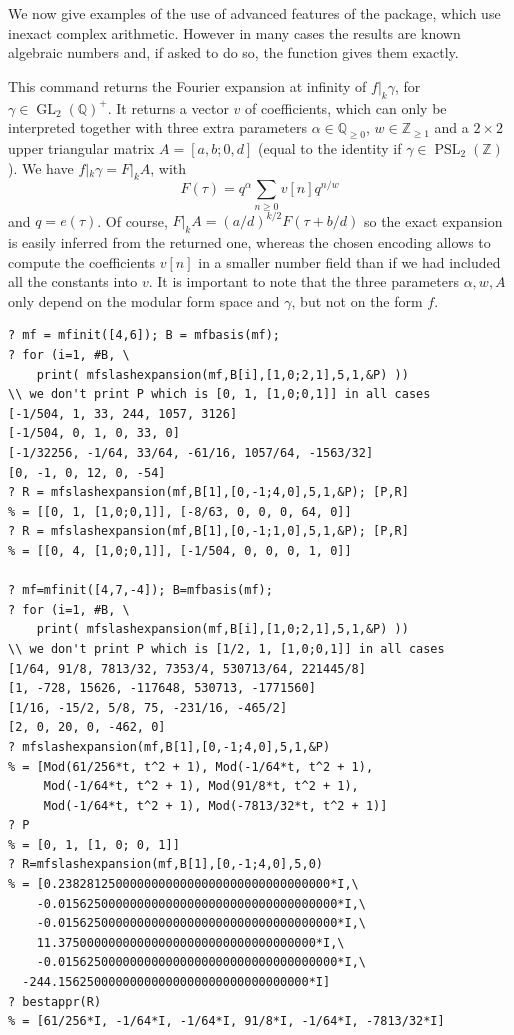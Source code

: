 \documentclass[11pt]{article}
\DeclareMathOperator{\PSL}{PSL}
\DeclareMathOperator{\GL}{GL}
\newcommand{\Q}{{\mathbb Q}}
\newcommand{\Z}{{\mathbb Z}}
\newcommand{\al}{\alpha}
\begin{document}
We now give examples of the use of advanced features of the package, which
use inexact complex arithmetic. However in many cases the results are known
algebraic numbers and, if asked to do so, the function gives them exactly.

This command returns the Fourier expansion at infinity of $f |_k \gamma$,
for $\gamma\in \GL_2(\Q)^+$. It returns a vector $v$ of coefficients, which
can only be interpreted together with three extra parameters
$\al\in \Q_{\geq 0}$, $w \in \Z_{\geq 1}$ and a
$2\times 2$ upper triangular matrix $A=[a,b;0,d]$
(equal to the identity if $\gamma\in\PSL_2(\Z)$). We have
$f |_k \gamma = F |_k A $, with
$$F(\tau) = q^\al \sum_{n\geq 0} v[n] q^{n/w}$$
and $q = e(\tau)$. Of course, $F |_k A = (a/d)^{k/2} F(\tau + b/d)$ so the
exact expansion is easily inferred from the returned one, whereas the chosen
encoding allows to compute the coefficients $v[n]$ in a smaller number field
than if we had included all the constants into $v$. It is important to note
that the three parameters $\al, w, A$ only depend on the modular form
space and $\gamma$, but not on the form $f$.

\begin{verbatim}
? mf = mfinit([4,6]); B = mfbasis(mf);
? for (i=1, #B, \
    print( mfslashexpansion(mf,B[i],[1,0;2,1],5,1,&P) ))
\\ we don't print P which is [0, 1, [1,0;0,1]] in all cases
[-1/504, 1, 33, 244, 1057, 3126]
[-1/504, 0, 1, 0, 33, 0]
[-1/32256, -1/64, 33/64, -61/16, 1057/64, -1563/32]
[0, -1, 0, 12, 0, -54]
? R = mfslashexpansion(mf,B[1],[0,-1;4,0],5,1,&P); [P,R]
% = [[0, 1, [1,0;0,1]], [-8/63, 0, 0, 0, 64, 0]]
? R = mfslashexpansion(mf,B[1],[0,-1;1,0],5,1,&P); [P,R]
% = [[0, 4, [1,0;0,1]], [-1/504, 0, 0, 0, 1, 0]]

? mf=mfinit([4,7,-4]); B=mfbasis(mf);
? for (i=1, #B, \
    print( mfslashexpansion(mf,B[i],[1,0;2,1],5,1,&P) ))
\\ we don't print P which is [1/2, 1, [1,0;0,1]] in all cases
[1/64, 91/8, 7813/32, 7353/4, 530713/64, 221445/8]
[1, -728, 15626, -117648, 530713, -1771560]
[1/16, -15/2, 5/8, 75, -231/16, -465/2]
[2, 0, 20, 0, -462, 0]
? mfslashexpansion(mf,B[1],[0,-1;4,0],5,1,&P)
% = [Mod(61/256*t, t^2 + 1), Mod(-1/64*t, t^2 + 1),
     Mod(-1/64*t, t^2 + 1), Mod(91/8*t, t^2 + 1),
     Mod(-1/64*t, t^2 + 1), Mod(-7813/32*t, t^2 + 1)]
? P
% = [0, 1, [1, 0; 0, 1]]
? R=mfslashexpansion(mf,B[1],[0,-1;4,0],5,0)
% = [0.23828125000000000000000000000000000000*I,\
    -0.015625000000000000000000000000000000000*I,\
    -0.015625000000000000000000000000000000000*I,\
    11.375000000000000000000000000000000000*I,\
    -0.015625000000000000000000000000000000000*I,\
  -244.15625000000000000000000000000000000*I]
? bestappr(R)
% = [61/256*I, -1/64*I, -1/64*I, 91/8*I, -1/64*I, -7813/32*I]
\end{verbatim}
\end{document}
